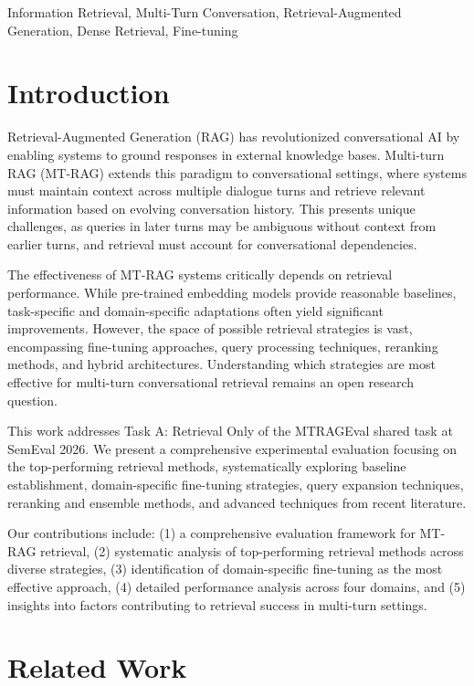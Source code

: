 \documentclass[conference]{IEEEtran}
\begin{document}
\begin{IEEEkeywords}
Information Retrieval, Multi-Turn Conversation, Retrieval-Augmented Generation, Dense Retrieval, Fine-tuning
\end{IEEEkeywords}

\section{Introduction}

Retrieval-Augmented Generation (RAG) has revolutionized conversational AI by enabling systems to ground responses in external knowledge bases. Multi-turn RAG (MT-RAG) extends this paradigm to conversational settings, where systems must maintain context across multiple dialogue turns and retrieve relevant information based on evolving conversation history. This presents unique challenges, as queries in later turns may be ambiguous without context from earlier turns, and retrieval must account for conversational dependencies.

The effectiveness of MT-RAG systems critically depends on retrieval performance. While pre-trained embedding models provide reasonable baselines, task-specific and domain-specific adaptations often yield significant improvements. However, the space of possible retrieval strategies is vast, encompassing fine-tuning approaches, query processing techniques, reranking methods, and hybrid architectures. Understanding which strategies are most effective for multi-turn conversational retrieval remains an open research question.

This work addresses Task A: Retrieval Only of the MTRAGEval shared task at SemEval 2026. We present a comprehensive experimental evaluation focusing on the top-performing retrieval methods, systematically exploring baseline establishment, domain-specific fine-tuning strategies, query expansion techniques, reranking and ensemble methods, and advanced techniques from recent literature.

Our contributions include: (1) a comprehensive evaluation framework for MT-RAG retrieval, (2) systematic analysis of top-performing retrieval methods across diverse strategies, (3) identification of domain-specific fine-tuning as the most effective approach, (4) detailed performance analysis across four domains, and (5) insights into factors contributing to retrieval success in multi-turn settings.

\section{Related Work}
\end{document}
